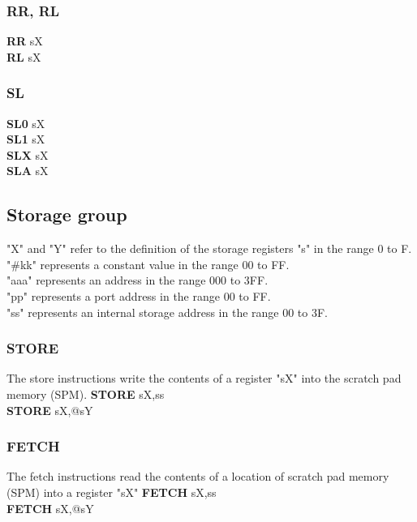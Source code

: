                         \subsubsection{RR, RL}
                            \textbf{RR}  sX\\
                            \textbf{RL}  sX\\
                        \subsubsection{SL}
                            \textbf{SL0} sX\\
                            \textbf{SL1} sX\\
                            \textbf{SLX} sX\\
                            \textbf{SLA} sX\\
                \subsection{Storage group}
                "X" and "Y" refer to the definition of the storage registers "s" in the range 0 to F.\\
                "\#kk" represents a constant value in the range 00 to FF.\\
                "aaa" represents an address in the range 000 to 3FF.\\
                "pp" represents a port address in the range 00 to FF.\\
                "ss" represents an internal storage address in the range 00 to 3F.\\
                        \subsubsection{STORE}
                        The store instructions write the contents of a register "sX" into the scratch pad memory (SPM).
                            \textbf{STORE} sX,ss\\
                            \textbf{STORE} sX,@sY\\

                        \subsubsection{FETCH}
                        The fetch instructions read the contents of a location of scratch pad memory (SPM) into a register "sX"
                            \textbf{FETCH} sX,ss\\
                            \textbf{FETCH} sX,@sY\\

